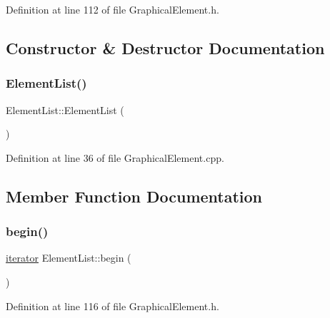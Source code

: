 Definition at line 112 of file Graphical\+Element.\+h.



\subsection{Constructor \& Destructor Documentation}
\mbox{\label{class_element_list_ae2d7329bdbfaf1f8dcb864776ee6de9b}} 
\subsubsection{\texorpdfstring{Element\+List()}{ElementList()}}
{\footnotesize\ttfamily Element\+List\+::\+Element\+List (\begin{DoxyParamCaption}{ }\end{DoxyParamCaption})}



Definition at line 36 of file Graphical\+Element.\+cpp.



\subsection{Member Function Documentation}
\mbox{\label{class_element_list_abd034ccb887a4cccedb6906e2b516a99}} 
\subsubsection{\texorpdfstring{begin()}{begin()}}
{\footnotesize\ttfamily \hyperlink{class_element_list_a10e1b0c17ebe441fcd035fcf0a00d25e}{iterator} Element\+List\+::begin (\begin{DoxyParamCaption}{ }\end{DoxyParamCaption})\hspace{0.3cm}{\ttfamily [inline]}}



Definition at line 116 of file Graphical\+Element.\+h.

\mbox{\label{class_element_list_a11b3b63aad29b085b5d77e2e623d6bb4}} 
